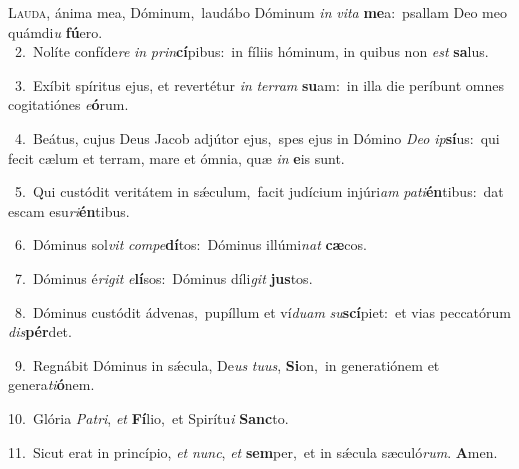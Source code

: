 \lettrine{\initial\textcolor{\initialcolor}{L}}{auda,} ánima mea, Dóminum,~\dagger laudábo Dóminum \textit{in} \textit{vi}\-\textit{ta} \textbf{me}\-a:~\star psallam Deo meo quámdi\textit{u} \textbf{fú}\-ero.\\
{\numbfont\textcolor{\numbcolor}{~2.}}~Nolíte confíde\textit{re} \textit{in} \textit{prin}\-\textbf{cí}pibus:~\star in fíliis hóminum, in quibus non \textit{est} \textbf{sa}\-lus.\par
{\numbfont\textcolor{\numbcolor}{~3.}}~Exíbit spíritus ejus, et revertétur \textit{in} \textit{ter}\-\textit{ram} \textbf{su}\-am:~\star in illa die períbunt omnes cogitatiónes \textit{e}\-\textbf{ó}rum.\par
{\numbfont\textcolor{\numbcolor}{~4.}}~Beátus, cujus Deus Jacob adjútor ejus,~\dagger spes ejus in Dómino \textit{De}\-\textit{o} \textit{ip}\-\textbf{sí}us:~\star qui fecit cælum et terram, mare et ómnia, quæ \textit{in} \textbf{e}\-is sunt.\par
{\numbfont\textcolor{\numbcolor}{~5.}}~Qui custódit veritátem in sǽculum,~\dagger facit judícium injúri\textit{am} \textit{pa}\-\textit{ti}\textbf{én}tibus:~\star dat escam esu\-\textit{ri}\-\textbf{én}tibus.\par
{\numbfont\textcolor{\numbcolor}{~6.}}~Dóminus sol\textit{vit} \textit{com}\-\textit{pe}\textbf{dí}tos:~\star Dóminus illúmi\textit{nat} \textbf{cæ}\-cos.\par
{\numbfont\textcolor{\numbcolor}{~7.}}~Dóminus é\-\textit{ri}\-\textit{git} \textit{e}\-\textbf{lí}sos:~\star Dóminus díli\textit{git} \textbf{jus}\-tos.\par
{\numbfont\textcolor{\numbcolor}{~8.}}~Dóminus custódit ádvenas,~\dagger pupíllum et ví\-\textit{du}\-\textit{am} \textit{su}\-\textbf{scí}piet:~\star et vias peccatórum \textit{dis}\-\textbf{pér}det.\par
{\numbfont\textcolor{\numbcolor}{~9.}}~Regnábit Dóminus in sǽcula, De\textit{us} \textit{tu}\-\textit{us}, \textbf{Si}\-on,~\star in generatiónem et genera\-\textit{ti}\-\textbf{ó}nem.\par
{\numbfont\textcolor{\numbcolor}{10.}}~Glória \textit{Pa}\-\textit{tri}, \textit{et} \textbf{Fí}\-lio,~\star et Spirítu\textit{i} \textbf{Sanc}\-to.\par
{\numbfont\textcolor{\numbcolor}{11.}}~Sicut erat in princípio, \textit{et} \textit{nunc}\-, \textit{et} \textbf{sem}\-per,~\star et in sǽcula sæculó\-\textit{rum}\-. \textbf{A}\-men.\par
